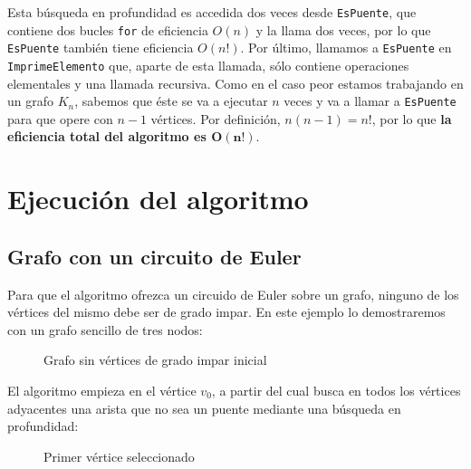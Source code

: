 Esta búsqueda en profundidad es accedida dos veces desde \texttt{EsPuente}, que contiene dos bucles \texttt{for} de eficiencia $O(n)$ y la llama dos veces, por lo que \texttt{EsPuente} también tiene eficiencia $O(n!)$.
Por último, llamamos a \texttt{EsPuente} en \texttt{ImprimeElemento} que, aparte de esta llamada, sólo contiene operaciones elementales y una llamada recursiva.
Como en el caso peor estamos trabajando en un grafo $K_n$, sabemos que éste se va a ejecutar $n$ veces y va a llamar a \texttt{EsPuente} para que opere con $n-1$ vértices.
Por definición, $n(n-1)=n!$, por lo que \textbf{la eficiencia total del algoritmo es $\boldsymbol{O(n!)}$}.

\section{Ejecución del algoritmo}\label{voraces-ejecucion}

\subsection{Grafo con un circuito de Euler}\label{voraces-ejecucion-circuito}

Para que el algoritmo ofrezca un circuido de Euler sobre un grafo, ninguno de los vértices del mismo debe ser de grado impar.
En este ejemplo lo demostraremos con un grafo sencillo de tres nodos:

\begin{figure}[h]
\begin{center}
\end{center}
\caption{Grafo sin vértices de grado impar inicial}
\end{figure}

El algoritmo empieza en el vértice $v_0$, a partir del cual busca en todos los vértices adyacentes una arista que no sea un puente mediante una búsqueda en profundidad:

\begin{figure}[h]
\begin{center}
\end{center}
\caption{Primer vértice seleccionado}
\end{figure}

